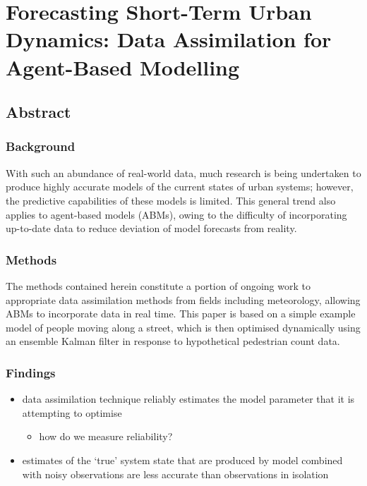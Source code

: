 \chapter{Forecasting Short-Term Urban Dynamics: Data Assimilation for Agent-Based Modelling}
\label{ch:malleson_tapper_ward_evans}

\section{Abstract}
\label{malleson:abstract}

\subsection{Background}
\label{malleson:abstract:background}

With such an abundance of real-world data, much research is being undertaken to produce highly accurate models of the current states of urban systems; however, the predictive capabilities of these models is limited.
This general trend also applies to agent-based models (ABMs), owing to the difficulty of incorporating up-to-date data to reduce deviation of model forecasts from reality. 

\subsection{Methods}
\label{malleson:abstract:methods}

The methods contained herein constitute a portion of ongoing work to appropriate data assimilation methods from fields including meteorology, allowing ABMs to incorporate data in real time.
This paper is based on a simple example model of people moving along a street, which is then optimised dynamically using an ensemble Kalman filter in response to hypothetical pedestrian count data.

\subsection{Findings}
\label{malleson:abstract:findings}

\begin{itemize}
    \item data assimilation technique reliably estimates the model parameter that it is attempting to optimise
    \begin{itemize}
        \item how do we measure reliability?
    \end{itemize}
    \item estimates of the `true' system state that are produced by model combined with noisy observations are less accurate than observations in isolation
\end{itemize}

